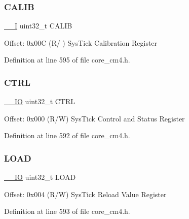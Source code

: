 \subsubsection{\texorpdfstring{C\+A\+L\+IB}{CALIB}}
{\footnotesize\ttfamily \hyperlink{group___c_m_s_i_s__core__definitions_gaf63697ed9952cc71e1225efe205f6cd3}{\+\_\+\+\_\+I} uint32\+\_\+t C\+A\+L\+IB}

Offset\+: 0x00C (R/ ) Sys\+Tick Calibration Register 

Definition at line 595 of file core\+\_\+cm4.\+h.

\mbox{\label{struct_sys_tick___type_a15fc8d35f045f329b80c544bef35ff64}} 
\subsubsection{\texorpdfstring{C\+T\+RL}{CTRL}}
{\footnotesize\ttfamily \hyperlink{group___c_m_s_i_s__core__definitions_gaec43007d9998a0a0e01faede4133d6be}{\+\_\+\+\_\+\+IO} uint32\+\_\+t C\+T\+RL}

Offset\+: 0x000 (R/W) Sys\+Tick Control and Status Register 

Definition at line 592 of file core\+\_\+cm4.\+h.

\mbox{\label{struct_sys_tick___type_aad9adf4efc940cddb8161b69cfbe19d3}} 
\subsubsection{\texorpdfstring{L\+O\+AD}{LOAD}}
{\footnotesize\ttfamily \hyperlink{group___c_m_s_i_s__core__definitions_gaec43007d9998a0a0e01faede4133d6be}{\+\_\+\+\_\+\+IO} uint32\+\_\+t L\+O\+AD}

Offset\+: 0x004 (R/W) Sys\+Tick Reload Value Register 

Definition at line 593 of file core\+\_\+cm4.\+h.

\mbox{\label{struct_sys_tick___type_a26fb318c3b0a0ec7f45daafd5f8799a3}} 
